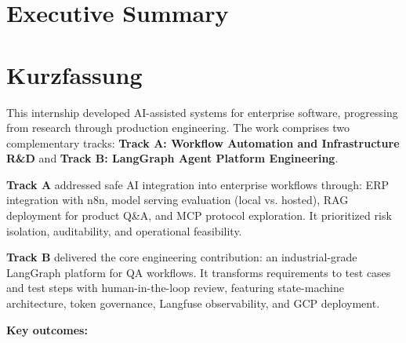 \ifdefined\ThesisLanguageIsEnglish
    \chapter*{Executive Summary}
\else
    \chapter*{Kurzfassung}
\fi
\label{ch:ExecutiveSummary}



This internship developed AI-assisted systems for enterprise software, progressing from research through production engineering. The work comprises two complementary tracks: \textbf{Track A: Workflow Automation and Infrastructure R\&D} and \textbf{Track B: LangGraph Agent Platform Engineering}.

\textbf{Track A} addressed safe AI integration into enterprise workflows through: ERP integration with n8n, model serving evaluation (local vs. hosted), RAG deployment for product Q\&A, and MCP protocol exploration. It prioritized risk isolation, auditability, and operational feasibility.

\textbf{Track B} delivered the core engineering contribution: an industrial-grade LangGraph platform for QA workflows. It transforms requirements to test cases and test steps with human-in-the-loop review, featuring state-machine architecture, token governance, Langfuse observability, and GCP deployment.

\textbf{Key outcomes:}

